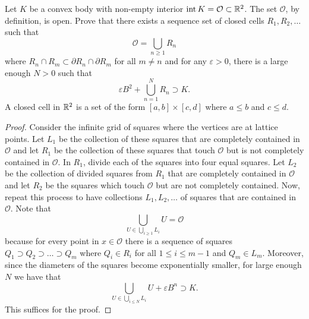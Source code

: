 \documentclass[12pt]{article}
\begin{document}
\begin{problem} \label{problem-2.12}
	Let $K$ be a convex body with non-empty interior $\operatorname{int} K = \mathcal{O} \subset \mathbb{R}^2$. The set $\mathcal{O}$, by definition, is open. Prove that there exists a sequence set of closed cells $R_1, R_2, \ldots$ such that 
    \[
        \mathcal{O} = \bigcup_{n \geq 1} R_n
    \]
    where $R_n \cap R_m \subset \partial R_n \cap \partial R_m$ for all $m \neq n$ and for any $\varepsilon > 0$, there is a large enough $N > 0$ such that 
    \[
        \varepsilon B^2 + \bigcup_{n = 1}^N R_n \supset K.
    \]
    A closed cell in $\mathbb{R}^2$ is a set of the form $[a, b] \times [c, d]$ where $a \leq b$ and $c \leq d$.
\end{problem}

\begin{proof}
	Consider the infinite grid of squares where the vertices are at lattice points. Let $L_1$ be the collection of these squares that are completely contained in $\mathcal{O}$ and let $R_1$ be the collection of these squares that touch $\mathcal{O}$ but is not completely contained in $\mathcal{O}$. In $R_1$, divide each of the squares into four equal squares. Let $L_2$ be the collection of divided squares from $R_1$ that are completely contained in $\mathcal{O}$ and let $R_2$ be the squares which touch $\mathcal{O}$ but are not completely contained. Now, repeat this process to have collections $L_1, L_2, \ldots$ of squares that are contained in $\mathcal{O}$. Note that 
	\[
		\bigcup_{U \in \bigcup_{i \geq 1} L_i} U = \mathcal{O}
	\]
	because for every point in $x \in \mathcal{O}$ there is a sequence of squares $Q_1 \supset Q_2 \supset \ldots \supset Q_m$ where $Q_i \in R_i$ for all $1 \leq i \leq m-1$ and $Q_m \in L_m$. Moreover, since the diameters of the squares become exponentially smaller, for large enough $N$ we have that 
	\[
		\bigcup_{U \in \bigcup_{i \leq N} L_i} U + \varepsilon B^n \supset K.
	\]
	This suffices for the proof.
\end{proof}

\newpage 
\end{document}

